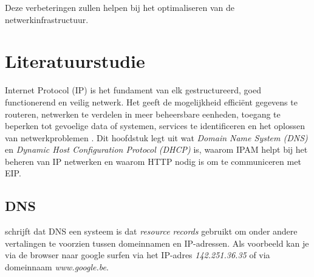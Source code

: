 Deze verbeteringen zullen helpen bij het optimaliseren van de netwerkinfrastructuur.

\section{Literatuurstudie}
\label{voorstel:begrippen}
Internet Protocol (IP) is het fundament van elk gestructureerd, goed functionerend en veilig netwerk. Het geeft de mogelijkheid efficiënt gegevens te routeren, netwerken te verdelen in meer beheersbare eenheden, toegang te beperken tot gevoelige data of systemen, services te identificeren en het oplossen van netwerkproblemen \autocite{Postel1981}. Dit hoofdstuk legt uit wat \textit{Domain Name System (DNS)} en \textit{Dynamic Host Configuration Protocol (DHCP)} is, waarom IPAM helpt bij het beheren van IP netwerken en waarom HTTP nodig is om te communiceren met EIP. 

\subsection{DNS}
\textcite{Mockapetris1987} schrijft dat DNS een systeem is dat \textit{resource records} gebruikt om onder andere vertalingen te voorzien tussen domeinnamen en IP-adressen. Als voorbeeld kan je via de browser naar google surfen via het IP-adres \textit{142.251.36.35} of via domeinnaam \textit{www.google.be}.

